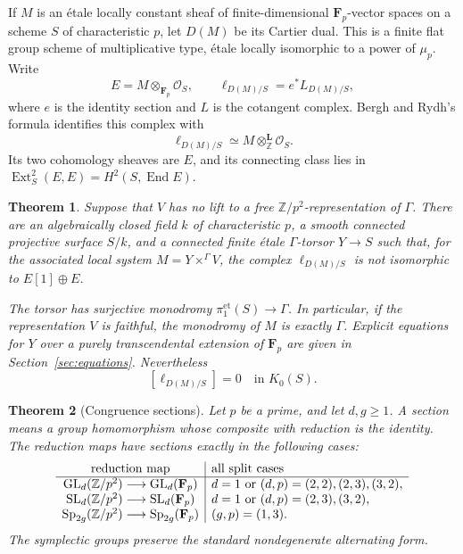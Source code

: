 \documentclass[11pt]{article}
\newcommand{\Fp}{\mathbf F_p}\newcommand{\OO}{\mathcal O}
\DeclareMathOperator{\SL}{SL}\DeclareMathOperator{\Sp}{Sp}
\DeclareMathOperator{\End}{End}\DeclareMathOperator{\Hom}{Hom}
\DeclareMathOperator{\Ext}{Ext}\DeclareMathOperator{\Tor}{Tor}
\newtheorem{theorem}{Theorem}[section]
\theoremstyle{definition}\newtheorem{definition}[theorem]{Definition}
\theoremstyle{remark}\newtheorem{remark}[theorem]{Remark}
\begin{document}
If $M$ is an \'etale locally constant sheaf of finite-dimensional $\Fp$-vector spaces on a scheme $S$ of characteristic $p$, let $D(M)$ be its Cartier dual. This is a finite flat group scheme of multiplicative type, \'etale locally isomorphic to a power of $\mu_p$. Write
\[
 E=M\otimes_{\Fp}\OO_S,\qquad
 \ell_{D(M)/S}=e^*L_{D(M)/S},
\]
where $e$ is the identity section and $L$ is the cotangent complex. Bergh and Rydh's formula identifies this complex with
\begin{equation}\label{eq:bergh}
 \ell_{D(M)/S}\simeq M\otimes^{\mathbf L}_{\mathbb Z}\OO_S.
\end{equation}
Its two cohomology sheaves are $E$, and its connecting class lies in
$\Ext^2_S(E,E)=H^2(S,\End E)$.

\begin{theorem}\label{thm:surface}
Suppose that $V$ has no lift to a free $\mathbb Z/p^2$-representation of $\Gamma$. There are an algebraically closed field $k$ of characteristic $p$, a smooth connected projective surface $S/k$, and a connected finite \'etale $\Gamma$-torsor $Y\to S$ such that, for the associated local system $M=Y\times^\Gamma V$, the complex $\ell_{D(M)/S}$ is not isomorphic to $E[1]\oplus E$.

The torsor has surjective monodromy $\pi_1^{\mathrm{et}}(S)\to\Gamma$. In particular, if the representation $V$ is faithful, the monodromy of $M$ is exactly $\Gamma$. Explicit equations for $Y$ over a purely transcendental extension of $\Fp$ are given in Section~\ref{sec:equations}. Nevertheless
\[
 [\ell_{D(M)/S}]=0\quad\text{in }K_0(S).
\]
\end{theorem}

\begin{theorem}[Congruence sections]\label{thm:sections}
Let $p$ be a prime, and let $d,g\geq1$. A section means a group homomorphism whose composite with reduction is the identity. The reduction maps have sections exactly in the following cases:
\[
\begin{array}{c|l}
\text{reduction map}&\text{all split cases}\\ \hline
\GL_d(\mathbb Z/p^2)\longrightarrow\GL_d(\Fp)
 &d=1\text{ or }(d,p)=(2,2),(2,3),(3,2),\\
\SL_d(\mathbb Z/p^2)\longrightarrow\SL_d(\Fp)
 &d=1\text{ or }(d,p)=(2,3),(3,2),\\
\Sp_{2g}(\mathbb Z/p^2)\longrightarrow\Sp_{2g}(\Fp)
 &(g,p)=(1,3).
\end{array}
\]
The symplectic groups preserve the standard nondegenerate alternating form.
\end{theorem}
\end{document}
